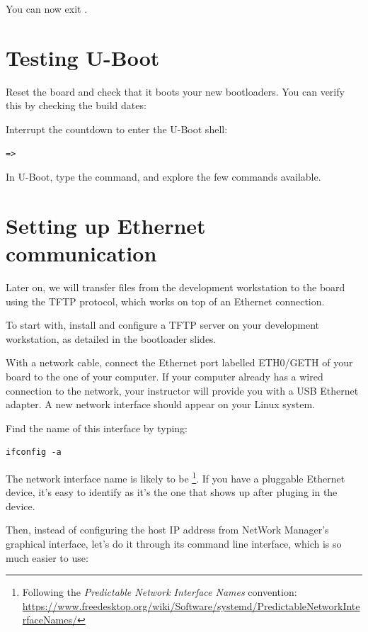 You can now exit .

\section{Testing U-Boot}

Reset the board and check that it boots your new bootloaders. You can
verify this by checking the build dates:



Interrupt the countdown to enter the U-Boot shell:
\begin{verbatim}
=>
\end{verbatim}

In U-Boot, type the  command, and explore the few commands
available.

\section{Setting up Ethernet communication}

Later on, we will transfer files from the development workstation to
the board using the TFTP protocol, which works on top of an Ethernet
connection.

To start with, install and configure a TFTP server on your development
workstation, as detailed in the bootloader slides.

With a network cable, connect the Ethernet port labelled ETH0/GETH of
your board to the one of your computer. If your computer already has a
wired connection to the network, your instructor will provide you with
a USB Ethernet adapter. A new network interface should appear on your
Linux system.

Find the name of this interface by typing:
\begin{verbatim}
ifconfig -a
\end{verbatim}

The network interface name is likely to be
\footnote{Following the {\em Predictable Network Interface
Names} convention:
\url{https://www.freedesktop.org/wiki/Software/systemd/PredictableNetworkInterfaceNames/}}.
If you have a pluggable Ethernet device, it's easy to identify as it's
the one that shows up after pluging in the device.

Then, instead of configuring the host IP address from NetWork Manager’s graphical interface,
let’s do it through its command line interface, which is so much easier to use:

